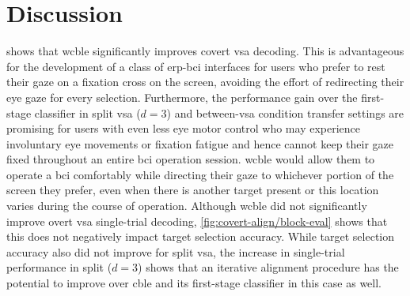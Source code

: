 \section{Discussion}

 shows that \ac{wcble} significantly improves
covert \ac{vsa} decoding.
This is advantageous for the development of a class of \ac{erp}-\ac{bci} interfaces for
users who prefer to rest their gaze on a fixation cross on the screen,
avoiding the effort of redirecting their eye gaze for every selection.
Furthermore, the performance gain over the first-stage classifier in split
\ac{vsa} ($d=3$) and between-\ac{vsa} condition transfer settings are promising for
users with even less eye motor control who may experience involuntary eye
movements or fixation fatigue and hence cannot keep their gaze fixed throughout an
entire \ac{bci} operation session.
\ac{wcble} would allow them to operate a \ac{bci} comfortably while directing
their gaze to whichever portion of the screen they prefer, even when there is
another target present or this location varies during the
course of operation.
Although \ac{wcble} did not significantly improve overt \ac{vsa} single-trial decoding,
\cref{fig:covert-align/block-eval} shows that this does not negatively impact target
selection accuracy.
While target selection accuracy also did not improve for split \ac{vsa}, the
increase in single-trial performance in split ($d=3$) shows that an iterative
alignment procedure has the potential to improve over \ac{cble} and its first-stage
classifier in this case as well.


